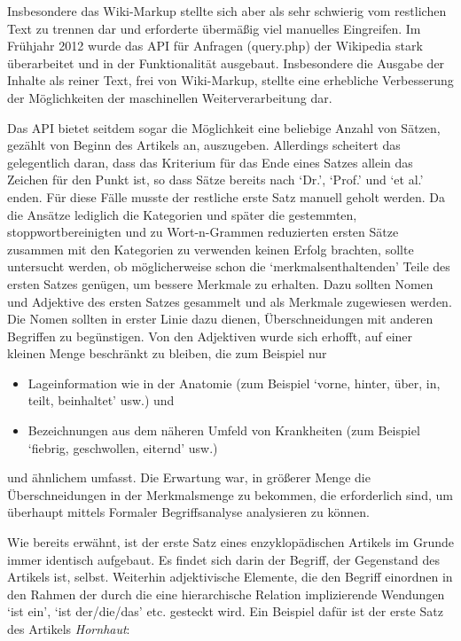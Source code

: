 \documentclass[pagesize,DIV=calc,12pt,draft]{scrreprt}
\begin{document}
Insbesondere das Wiki-Markup stellte sich aber als sehr schwierig vom restlichen Text zu trennen dar und erforderte übermäßig viel manuelles Eingreifen. 
Im Frühjahr 2012 wurde das API für Anfragen (query.php) der Wikipedia stark überarbeitet und in der Funktionalität ausgebaut. 
Insbesondere die Ausgabe der Inhalte als reiner Text, frei von Wiki-Markup, stellte eine erhebliche Verbesserung der Möglichkeiten der maschinellen Weiterverarbeitung dar. 

Das API bietet seitdem sogar die Möglichkeit eine beliebige Anzahl von Sätzen, gezählt von Beginn des Artikels an, auszugeben. 
Allerdings scheitert das gelegentlich daran, dass das Kriterium für das Ende eines Satzes allein das Zeichen für den Punkt ist, so dass Sätze bereits nach `Dr.', `Prof.' und `et al.' enden. 
Für diese Fälle musste der restliche erste Satz manuell geholt werden. 
Da die Ansätze lediglich die Kategorien und später die gestemmten, stoppwortbereinigten und zu Wort-n-Grammen reduzierten ersten Sätze zusammen mit den Kategorien zu verwenden keinen Erfolg brachten, sollte untersucht werden, ob möglicherweise schon die `merkmalsenthaltenden' Teile des ersten Satzes genügen, um bessere Merkmale zu erhalten. 
Dazu sollten Nomen und Adjektive des ersten Satzes gesammelt und als Merkmale zugewiesen werden. 
Die Nomen sollten in erster Linie dazu dienen, Überschneidungen mit anderen Begriffen zu begünstigen. 
Von den Adjektiven wurde sich erhofft, auf einer kleinen Menge beschränkt zu bleiben, die zum Beispiel nur 

\begin{itemize}
\item Lageinformation wie in der Anatomie (zum Beispiel `vorne, hinter, über, in, teilt, beinhaltet' usw.) und
\item Bezeichnungen aus dem näheren Umfeld von Krankheiten (zum Beispiel `fiebrig, geschwollen, eiternd' usw.)
\end{itemize}

und ähnlichem umfasst. 
Die Erwartung war, in größerer Menge die Überschneidungen in der Merkmalsmenge zu bekommen, die erforderlich sind, um überhaupt mittels Formaler Begriffsanalyse analysieren zu können. 

Wie bereits erwähnt, ist der erste Satz eines enzyklopädischen Artikels im Grunde immer identisch aufgebaut. 
Es findet sich darin der Begriff, der Gegenstand des Artikels ist, selbst. 
Weiterhin adjektivische Elemente, die den Begriff einordnen in den Rahmen der durch die eine hierarchische Relation implizierende Wendungen `ist ein', `ist der/die/das' etc. gesteckt wird. 
Ein Beispiel dafür ist der erste Satz des Artikels \emph{Hornhaut}: 
\end{document}
